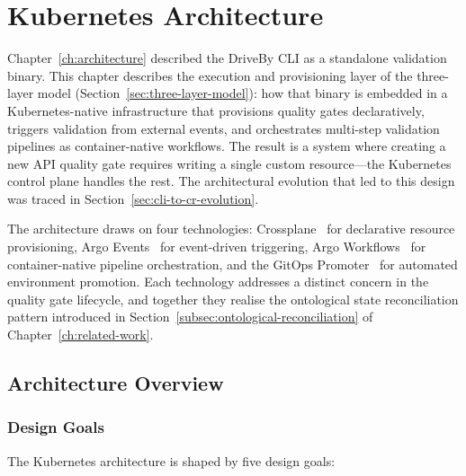 \chapter{Kubernetes Architecture}
\label{ch:kubernetes}

Chapter~\ref{ch:architecture} described the DriveBy CLI as a standalone validation binary. This chapter describes the execution and provisioning layer of the three-layer model (Section~\ref{sec:three-layer-model}): how that binary is embedded in a Kubernetes-native infrastructure that provisions quality gates declaratively, triggers validation from external events, and orchestrates multi-step validation pipelines as container-native workflows. The result is a system where creating a new API quality gate requires writing a single custom resource---the Kubernetes control plane handles the rest. The architectural evolution that led to this design was traced in Section~\ref{sec:cli-to-cr-evolution}.

The architecture draws on four technologies: Crossplane~\cite{crossplane} for declarative resource provisioning, Argo Events~\cite{argo-events} for event-driven triggering, Argo Workflows~\cite{argo-workflows} for container-native pipeline orchestration, and the GitOps Promoter~\cite{gitops-promoter} for automated environment promotion. Each technology addresses a distinct concern in the quality gate lifecycle, and together they realise the ontological state reconciliation pattern introduced in Section~\ref{subsec:ontological-reconciliation} of Chapter~\ref{ch:related-work}.

\section{Architecture Overview}
\label{sec:k8s-overview}

\subsection{Design Goals}
\label{subsec:k8s-design-goals}

The Kubernetes architecture is shaped by five design goals:

